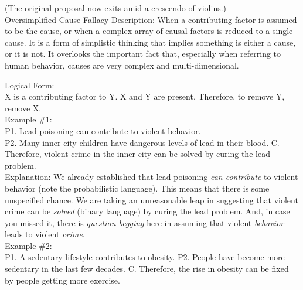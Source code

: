 \documentclass[a4paper,12pt,single,pdftex]{scrartcl}
\begin{document}
    
      (The original proposal now exits amid a crescendo of violins.)
    \\

  

Oversimplified Cause Fallacy
    Description: When a contributing factor is assumed to be the cause, or when a complex array of causal factors is reduced to a single cause. It is a form of simplistic thinking that implies something is either a cause, or it is not. It overlooks the important fact that, especially when referring to human behavior, causes are very complex and multi-dimensional.

    
      Logical Form:
    \\

    
      X is a contributing factor to Y. \newline
X and Y are present. \newline
Therefore, to remove Y, remove X.
    \\

    
      Example \#1:
    \\

    
      P1. Lead poisoning can contribute to violent behavior.
    \\

    
      P2. Many inner city children have dangerous levels of lead in their blood. \newline
C. Therefore, violent crime in the inner city can be solved  by curing the lead problem.
    \\

    
      Explanation: We already established that lead poisoning {\it can contribute} to violent behavior (note the probabilistic language). This means that there is some unspecified chance. We are taking an unreasonable leap in suggesting that violent crime can be {\it solved}  (binary language) by curing the lead problem. And, in case you missed it, there is {\it question begging} here in assuming that violent {\it behavior} leads to violent {\it crime}.
    \\

    
      Example \#2:
    \\

    
      P1. A sedentary lifestyle contributes to obesity. \newline
P2. People have become more sedentary in the last few decades. \newline
C. Therefore, the rise in obesity can be fixed by people getting more exercise.
    \\
\end{document}
